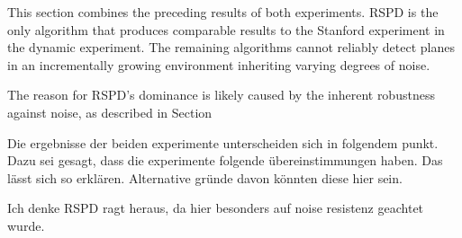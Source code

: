 \documentclass[main.tex]{subfiles}
\begin{document}
This section combines the preceding results of both experiments.
RSPD is the only algorithm that produces comparable results to the Stanford experiment in the dynamic experiment.
The remaining algorithms cannot reliably detect planes in an incrementally growing environment inheriting varying degrees of noise.

The reason for RSPD's dominance is likely caused by the inherent robustness against noise, as described in Section~

Die ergebnisse der beiden experimente unterscheiden sich in folgendem punkt. Dazu sei gesagt, dass die experimente folgende übereinstimmungen haben.
Das lässt sich so erklären. Alternative gründe davon könnten diese hier sein.

Ich denke RSPD ragt heraus, da hier besonders auf noise resistenz geachtet wurde. %
\end{document}
